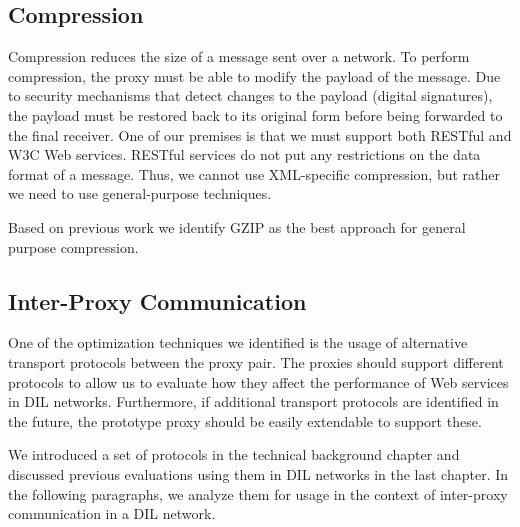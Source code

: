 \subsection{Compression}

Compression reduces the size of a message sent over a network. To perform
compression, the proxy must be able to modify the payload of the message. Due to
security mechanisms that detect changes to the payload (digital signatures), the
payload must be restored back to its original form before being forwarded to the
final receiver. One of our premises is that we must support both RESTful and W3C
Web services. RESTful services do not put any restrictions on the data format of
a message. Thus, we cannot use XML-specific compression, but rather we need to
use general-purpose techniques.

Based on previous work we identify GZIP as the best approach for general
purpose compression.

\subsection{Inter-Proxy Communication}

One of the optimization techniques we identified is the usage of alternative
transport protocols between the proxy pair. The proxies should support different
protocols to allow us to evaluate how they affect the performance of Web
services in DIL networks. Furthermore, if additional transport protocols are
identified in the future, the prototype proxy should be easily extendable to
support these.

We introduced a set of protocols in the technical background chapter and
discussed previous evaluations using them in DIL networks in the last chapter.
In the following paragraphs, we analyze them for usage in the context of
inter-proxy communication in a DIL network.

